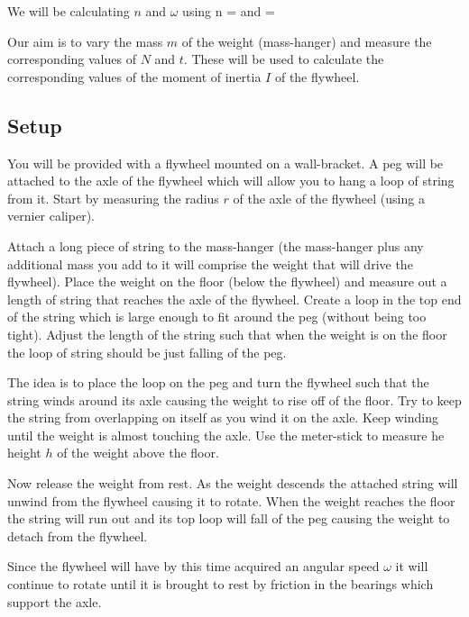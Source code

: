     \eline
    We will be calculating $n$ and $\omega$ using
    \beq \label{n}
        n = 
    \eeq
    and
    \beq \label{omega}
        \omega = 
    \eeq

    Our aim is to vary the mass $m$ of the weight (mass-hanger) and measure the corresponding values of $N$ and $t$. These will be used to calculate the corresponding values of the moment of inertia $I$ of the flywheel.


    \subsection{Setup}

        \diag

        You will be provided with a flywheel mounted on a wall-bracket. A peg will be attached to the axle of the flywheel which will allow you to hang a loop of string from it. Start by measuring the radius $r$ of the axle of the flywheel (using a vernier caliper).

        Attach a long piece of string to the mass-hanger (the mass-hanger plus any additional mass you add to it will comprise the weight that will drive the flywheel). Place the weight on the floor (below the flywheel) and measure out a length of string that reaches the axle of the flywheel. Create a loop in the top end of the string which is large enough to fit around the peg (without being too tight). Adjust the length of the string such that when the weight is on the floor the loop of string should be just falling of the peg.

        The idea is to place the loop on the peg and turn the flywheel such that the string winds around its axle causing the weight to rise off of the floor. Try to keep the string from overlapping on itself as you wind it on the axle. Keep winding until the weight is almost touching the axle. Use the meter-stick to measure he height $h$ of the weight above the floor.

        Now release the weight from rest. As the weight descends the attached string will unwind from the flywheel causing it to rotate. When the weight reaches the floor the string will run out and its top loop will fall of the peg causing the weight to detach from the flywheel.

        Since the flywheel will have by this time acquired an angular speed $\omega$ it will continue to rotate until it is brought to rest by friction in the bearings which support the axle.


